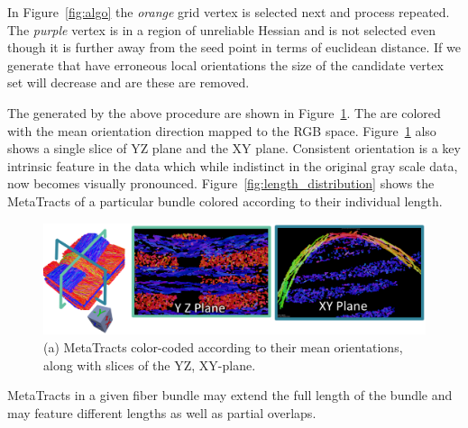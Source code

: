 In Figure~\ref{fig:algo} the \textit{orange} grid vertex is selected next and process repeated. The \textit{purple} vertex is in a region of unreliable Hessian and is not selected even though it is further away from the seed point in terms of euclidean distance. If we generate \mt that have erroneous local orientations the size of the candidate vertex set will decrease and are these are removed.

The \mt generated by the above procedure are shown in Figure~\ref{fig:metaTracts}. The \mt are colored with the mean orientation direction mapped to the RGB space. Figure~\ref{fig:metaTracts} also shows a single slice of YZ plane and the XY plane. Consistent orientation is a key intrinsic feature in the data which while indistinct in the original gray scale data, now becomes visually pronounced.
Figure~\ref{fig:length_distribution} shows the MetaTracts of a particular bundle colored according to their individual length.
\begin{figure}[htb]
\centering
	\includegraphics[width=\linewidth]{images/metaTracts.eps}
	\caption{(a) MetaTracts color-coded according to their mean orientations, along with slices of the YZ, XY-plane.}
	\label{fig:metaTracts}
\end{figure}

MetaTracts in a given fiber bundle may extend the full length of the bundle and may feature different lengths as well as partial overlaps.
